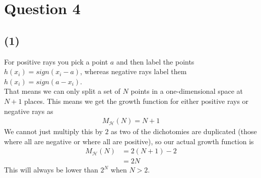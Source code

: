 \documentclass[a4paper]{article}
\begin{document}
\newpage
\section*{Question 4}
\subsection*{(1)}
For positive rays you pick a point $a$ and then label the points $h(x_i)=sign(x_i-a)$, whereas negative rays label them $h(x_i)=sign(a-x_i)$.\\
That means we can only split a set of $N$ points in a one-dimensional space at $N+1$ places. This means we get the growth function for either positive rays or negative rays as
\begin{align*}
M_\mathcal{H}(N) = N+1
\end{align*}
We cannot just multiply this by $2$ as two of the dichotomies are duplicated (those where all are negative or where all are positive), so our actual growth function is
\begin{align*}
M_\mathcal{H}(N) &= 2(N+1)-2  \\
&= 2N
\end{align*}
This will always be lower than $2^N$ when $N> 2$.
\end{document}
